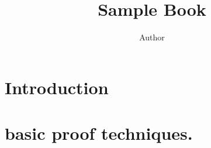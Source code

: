 \documentclass[12pt]{svmono}
\title{Sample Book}
\author{Author}
\begin{document}
\frontmatter
\maketitle

\tableofcontents

 \frontmatter
\mainmatter
\chapter{Introduction}


%
%


\mainmatter
\chapter{basic proof techniques.}


\appendix
\appendixpage
\noappendicestocpagenum
\addappheadtotoc






\end{document}
